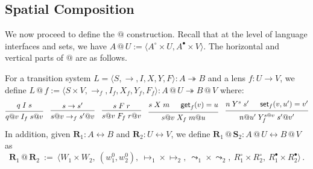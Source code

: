 \documentclass[acmsmall,screen,review,anonymous]{acmart}
\newcommand{\kw}[1]{\ensuremath{ \mathsf{#1} }}
\newcommand{\que}{\circ}
\newcommand{\ans}{\bullet}
\newcommand{\intl}[1]{#1^0}
\begin{document}

\subsection{Spatial Composition} \label{sec:scomp:tr} \label{sec:scomp:sc} %

We now proceed to define the $\mathbin@$ construction.
Recall that at the level of language interfaces and sets,
we have $A \mathbin@ U := \langle A^\que \times U, A^\ans \times V \rangle$.
The horizontal and vertical parts of $\mathbin@$ are as follows.

\begin{definition} \label{def:lift} \label{def:sctens} %
For a transition system
$L = \langle S, {\rightarrow}, I, X, Y, F \rangle : A \twoheadrightarrow B$
and a lens $f : U \rightarrow V$,
we define
$L \mathbin@ f :=
 \langle S \times V, {\rightarrow_f}, I_f, X_f, Y_f, F_f \rangle
 : A \mathbin@ U \twoheadrightarrow B \mathbin@ V$
where:
\begin{gather*}
 {\begin{prooftree}
    \hypo{q \mathrel{I} s}
    \infer1{q@v \mathrel{I_f} s@ v}
  \end{prooftree}}
  \quad
 {\begin{prooftree}
    \hypo{s \rightarrow s'}
    \infer1{s@v \rightarrow_f s'@v}
  \end{prooftree}}
  \quad
 {\begin{prooftree}
    \hypo{s \mathrel{F} r}
    \infer1{s@v \mathrel{F_f} r@v}
  \end{prooftree}}
  \quad
 {\begin{prooftree}
    \hypo{s \mathrel{X} m}
    \hypo{\kw{get}_f(v) = u}
    \infer2{s@v \mathrel{X_f} m@u}
  \end{prooftree}}
  \quad
 {\begin{prooftree}
    \hypo{n \mathrel{Y}^s s'}
    \hypo{\kw{set}_f(v, u') = v'}
    \infer2{n@u' \mathrel{Y^{s@v}_f} s'@v'}
  \end{prooftree}}
\end{gather*}
In addition,
given $\mathbf{R}_1 : A \leftrightarrow B$
and $\mathbf{R}_2 : U \leftrightarrow V$,
we define
$\mathbf{R}_1 \mathbin@ \mathbf{S}_2 :
 A \mathbin@ U \leftrightarrow B \mathbin@ V$
as
\[
  \mathbf{R}_1 \mathbin@ \mathbf{R}_2 \: := \:
    \big\langle
      W_1 \times W_2, \:
      (\intl{w}_1, \intl{w}_2), \:
      {\mapsto_1} \times {\mapsto_2}, \:
      {\leadsto_1} \times {\leadsto_2}, \:
      R_1^\que \times R_2^\que, \:
      R_1^\ans \times R_2^\ans
    \big\rangle
  \,.
\]
\end{definition}
\end{document}
